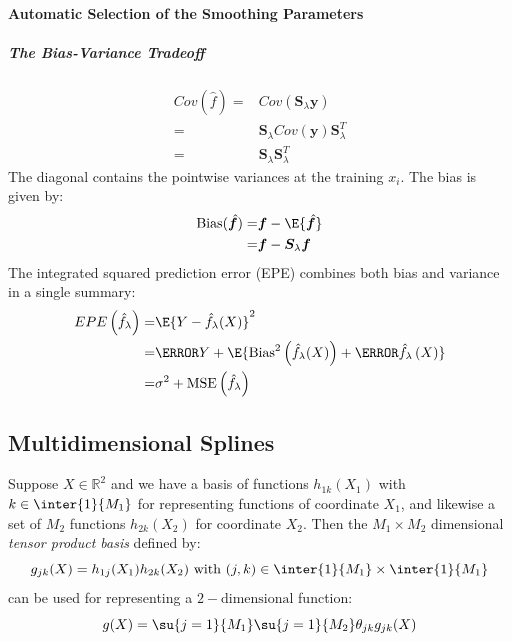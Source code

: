 \paragraph{Automatic Selection of the Smoothing Parameters}
\subparagraph{The Bias-Variance Tradeoff}
\begin{align*}
	Cov\left(\hat{f}\right) =& Cov\left(\bm{S}_{\lambda}\bm{y}\right)\\
	=& \bm{S}_{\lambda} Cov\left(\bm{y}\right)\bm{S}_{\lambda}^{T}\\
	=& \bm{S}_{\lambda}\bm{S}_{\lambda}^{T}
\end{align*}
The diagonal contains the pointwise variances at the training $x_{i}$. The bias is given by:
\begin{align*}
	\text{Bias}(\hat{\bm{f}}) =& \bm{f} - \E{\hat{\bm{f}}}\\
	=& \bm{f} - \bm{S}_{\lambda}\bm{f}
\end{align*}
The integrated squared prediction error (EPE) combines both bias and variance in a single 
summary:
\begin{align*}
	EPE\left(\hat{f}_{\lambda}\right) =& \E{Y-\hat{f}_{\lambda}(X)}^{2}\\
	=& \V{Y}+\E{\text{Bias}^{2}\left(\hat{f}_{\lambda}(X)\right)+\V{\hat{f}_{\lambda}\left(X \right)}}\\
	=& \sigma^{2} + \text{MSE}\left(\hat{f}_{\lambda}\right)
\end{align*}

\subsection{Multidimensional Splines}

Suppose $X\in\mathbb{R}^{2}$ and we have a basis of functions $h_{1k}(X_{1})$ with $k\in\inter{1}{
M_{1}}$ for representing functions of coordinate $X_{1}$, and likewise a set of $M_{2}$ functions
$h_{2k}(X_{2})$ for coordinate $X_{2}$. Then the $M_{1}\times M_{2}$ dimensional \textit{tensor
product basis} defined by:
$$ g_{jk}(X) = h_{1j}(X_{1})h_{2k}(X_{2})\text{ with }(j,k)\in\inter{1}{M_{1}}\times\inter{1}{M_{
1}}$$ can be used for representing a $2-\text{dimensional}$ function: 
$$g(X)=\su{{j=1}}{M_{1}}\su{{j=1}}{M_{2}}\theta_{jk}g_{jk}(X)$$

